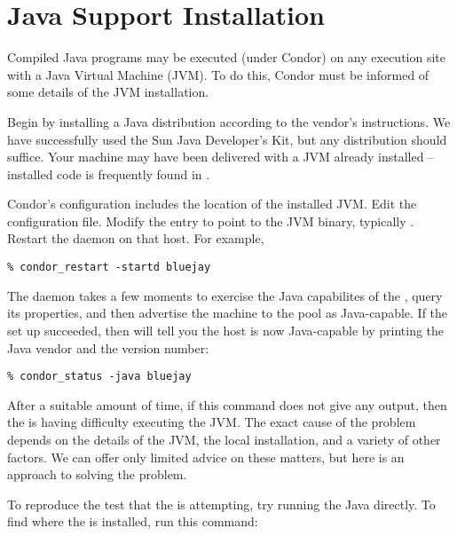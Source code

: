 \section{\label{sec:java-install}Java Support Installation}


Compiled Java programs may be executed (under Condor) on
any
execution site with a
Java Virtual Machine (JVM).
To do this,
Condor must be informed of some details of the
JVM installation.

Begin by installing a Java distribution according to the vendor's
instructions.
We have successfully used the Sun Java Developer's Kit,
but any distribution should suffice.
Your machine may have
been delivered with a JVM already installed -- installed code
is frequently found in .

Condor's configuration includes the location of the installed
JVM.
Edit the configuration file.
Modify the  entry to point to the JVM binary,
typically .
Restart the  daemon on that host.  For example,

\begin{verbatim}
% condor_restart -startd bluejay
\end{verbatim}

The  daemon takes a few moments to exercise the Java
capabilites of the , query its properties,
and then advertise the machine
to the pool as Java-capable.
If the set up succeeded, then  will
tell you the host is now Java-capable by printing the Java
vendor and the version number:

\begin{verbatim}
% condor_status -java bluejay
\end{verbatim}

After a suitable amount of time, if this command does not give any output,
then the   is having difficulty executing the JVM.
The exact cause of the problem depends on the details of the
JVM, the local installation, and a variety of other factors.
We can offer only limited advice on these matters,
but here is an approach to solving the problem.

To reproduce the test that the  is attempting,
try running the Java  directly.  To find
where the  is installed, run this command:

